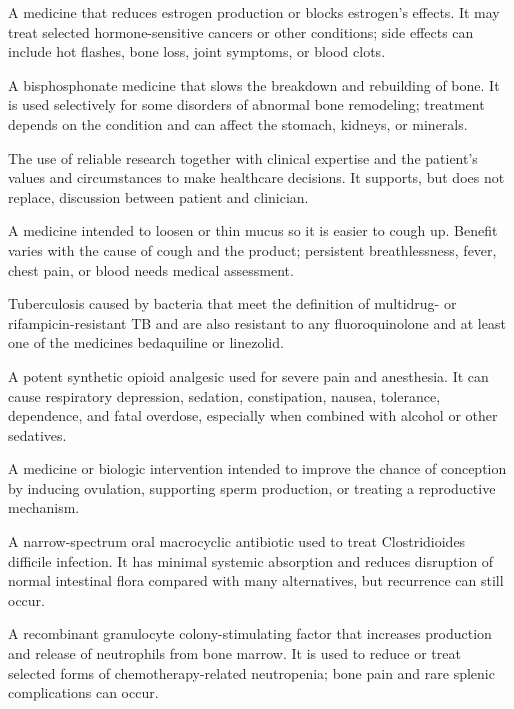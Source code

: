  A medicine that reduces estrogen production or blocks estrogen’s effects. It may treat selected hormone-sensitive cancers or other conditions; side effects can include hot flashes, bone loss, joint symptoms, or blood clots.

 A bisphosphonate medicine that slows the breakdown and rebuilding of bone. It is used selectively for some disorders of abnormal bone remodeling; treatment depends on the condition and can affect the stomach, kidneys, or minerals.

 The use of reliable research together with clinical expertise and the patient’s values and circumstances to make healthcare decisions. It supports, but does not replace, discussion between patient and clinician.

 A medicine intended to loosen or thin mucus so it is easier to cough up. Benefit varies with the cause of cough and the product; persistent breathlessness, fever, chest pain, or blood needs medical assessment.

 Tuberculosis caused by bacteria that meet the definition of multidrug- or rifampicin-resistant TB and are also resistant to any fluoroquinolone and at least one of the medicines bedaquiline or linezolid.

 A potent synthetic opioid analgesic used for severe pain and anesthesia. It can cause respiratory depression, sedation, constipation, nausea, tolerance, dependence, and fatal overdose, especially when combined with alcohol or other sedatives.

 A medicine or biologic intervention intended to improve the chance of conception by inducing ovulation, supporting sperm production, or treating a reproductive mechanism.

 A narrow-spectrum oral macrocyclic antibiotic used to treat Clostridioides difficile infection. It has minimal systemic absorption and reduces disruption of normal intestinal flora compared with many alternatives, but recurrence can still occur.

 A recombinant granulocyte colony-stimulating factor that increases production and release of neutrophils from bone marrow. It is used to reduce or treat selected forms of chemotherapy-related neutropenia; bone pain and rare splenic complications can occur.

